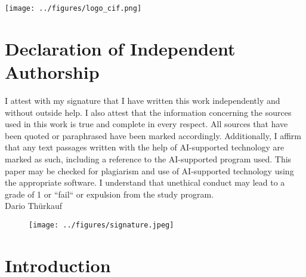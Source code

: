 \documentclass[12pt,a4paper,titlepage,oneside,english]{article}
\begin{document}
\vfill
\begin{center}
\texttt{[image: ../figures/logo\_cif.png]}
\end{center}
\newpage
\singlespacing
\section*{Declaration of Independent Authorship}
I attest with my signature that I have written this work independently and without outside help. I also attest that the information concerning the sources used in this work is true and complete in every respect. All sources that have been quoted or paraphrased have been marked accordingly. 
Additionally, I affirm that any text passages written with the help of AI-supported technology are marked as such, including a reference to the AI-supported program used. This paper may be checked for plagiarism and use of AI-supported technology using the appropriate software. I understand that unethical conduct may lead to a grade of 1 or ``fail`` or expulsion from the study program.\\

Dario Thürkauf

\begin{figure}[h!]
	\centering
	\hspace{-10cm}
	\texttt{[image: ../figures/signature.jpeg]}
\end{figure}

\newpage
\onehalfspacing
{}



\section{Introduction}
\end{document}
